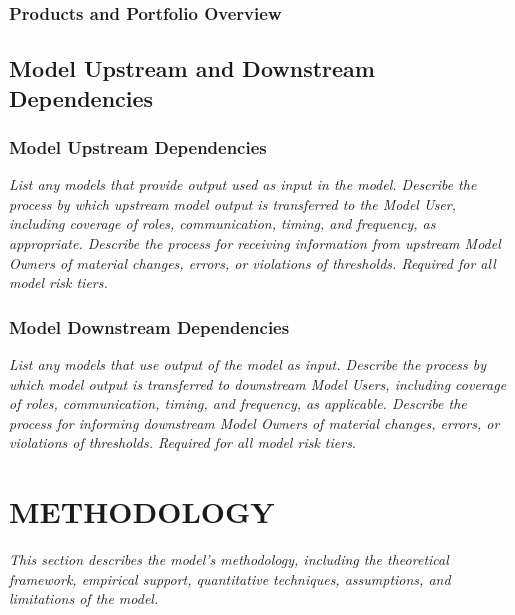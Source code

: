 \documentclass[12pt,letterpaper]{article}
\begin{document}
\subsubsection{Products and Portfolio Overview}

\subsection{Model Upstream and Downstream Dependencies}

\subsubsection{Model Upstream Dependencies}
\textit{List any models that provide output used as input in the model. Describe the process by which upstream model output is transferred to the Model User, including coverage of roles, communication, timing, and frequency, as appropriate. Describe the process for receiving information from upstream Model Owners of material changes, errors, or violations of thresholds. Required for all model risk tiers.}

\subsubsection{Model Downstream Dependencies}
\textit{List any models that use output of the model as input. Describe the process by which model output is transferred to downstream Model Users, including coverage of roles, communication, timing, and frequency, as applicable. Describe the process for informing downstream Model Owners of material changes, errors, or violations of thresholds. Required for all model risk tiers.}

\section{METHODOLOGY}
\textit{This section describes the model's methodology, including the theoretical framework, empirical support, quantitative techniques, assumptions, and limitations of the model.}
\end{document}
